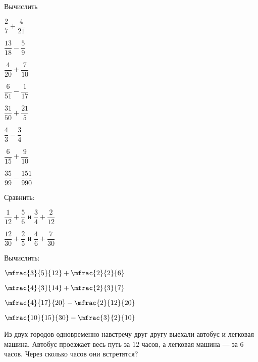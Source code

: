 \begin{class}[number=2]
\begin{listofex}
		\item Вычислить
		\begin{enumcols}[itemcolumns=4]
			\item \( \dfrac{2}{7}+\dfrac{4}{21} \)
			\item \( \dfrac{13}{18}-\dfrac{5}{9} \)
			\item \( \dfrac{4}{20}+\dfrac{7}{10} \)
			\item \( \dfrac{6}{51}-\dfrac{1}{17} \)
			\item \( \dfrac{31}{50}+\dfrac{21}{5} \)
			\item \( \dfrac{4}{3}-\dfrac{3}{4} \)
			\item \( \dfrac{6}{15}+\dfrac{9}{10} \)
			\item \( \dfrac{35}{99}-\dfrac{151}{990} \)
		\end{enumcols}
		\item Сравнить:
		\begin{enumcols}[itemcolumns=2]
			\item \( \dfrac{1}{12}+\dfrac{5}{6} \) и \( \dfrac{3}{4}+\dfrac{2}{12} \)
			\item \( \dfrac{12}{30}+\dfrac{2}{5} \) и \( \dfrac{4}{6}+\dfrac{7}{30} \)
		\end{enumcols}
		\item Вычислить:
		\begin{enumcols}[itemcolumns=4]
			\item \( \mfrac{3}{5}{12}+\mfrac{2}{2}{6} \)
			\item \( \mfrac{4}{3}{14}+\mfrac{2}{3}{7} \)
			\item \( \mfrac{4}{17}{20}-\mfrac{2}{12}{20} \)
			\item \( \mfrac{10}{15}{30}-\mfrac{3}{2}{10} \)
		\end{enumcols}
		\item Из двух городов одновременно навстречу друг другу выехали автобус и легковая
		машина. Автобус проезжает весь путь за \( 12 \) часов, а легковая машина --- за \( 6 \) часов. Через сколько часов они встретятся?
	\end{listofex}
\end{class}
